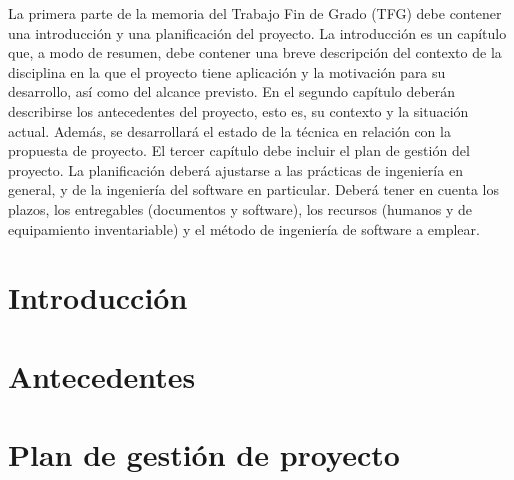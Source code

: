 \null\vfill
\noindent La primera parte de la memoria del Trabajo Fin de Grado (TFG) debe contener una introducción y una planificación del proyecto. La introducción es un capítulo que, a modo de resumen, debe contener una breve descripción del contexto de la disciplina en la que el proyecto tiene aplicación y la motivación para su desarrollo, así como del alcance previsto. En el segundo capítulo deberán describirse los antecedentes del proyecto, esto es, su contexto y la situación actual. Además, se desarrollará el estado de la técnica en relación con la propuesta de proyecto. El tercer capítulo debe incluir el plan de gestión del proyecto. La planificación deberá ajustarse a las prácticas de ingeniería en general, y de la ingeniería del software en particular. Deberá tener en cuenta los plazos, los entregables (documentos y software), los recursos (humanos y de equipamiento inventariable) y el método de ingeniería de software a emplear.
\\

\chapter{Introducción}
\label{cap:introduccion}


\newpage{\ }
\cleardoublepage

\chapter{Antecedentes}
\label{cap:background}


\newpage{\ }
\cleardoublepage

\chapter{Plan de gestión de proyecto}
\label{cap:planificación}


